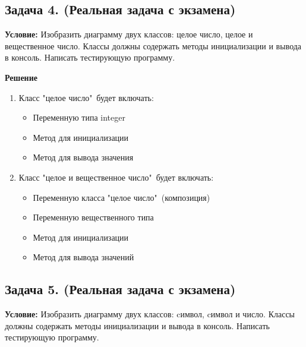 {}


{}



\newpage\subsection{Задача 4. (Реальная задача с экзамена)}
{\bf Условие:} Изобразить диаграмму двух классов: целое число, целое и вещественное число. Классы должны содержать методы инициализации и вывода в консоль. Написать тестирующую программу.


{\bf Решение}

\begin{enumerate}
\item Класс "целое число"\ будет включать:
\begin{itemize}
    \item Переменную типа integer
    \item Метод для инициализации
    \item Метод для вывода значения
\end{itemize}

\item Класс "целое и вещественное число"\ будет включать:
\begin{itemize}
    \item Переменную класса "целое число"\ (композиция)
    \item Переменную вещественного типа
    \item Метод для инициализации
    \item Метод для вывода значений
\end{itemize}
\end{enumerate}

{}


{}



\newpage\subsection{Задача 5. (Реальная задача с экзамена)}
{\bf Условие:} Изобразить диаграмму двух классов: cимвол, cимвол и число. Классы должны содержать методы инициализации и вывода в консоль. Написать тестирующую программу.


